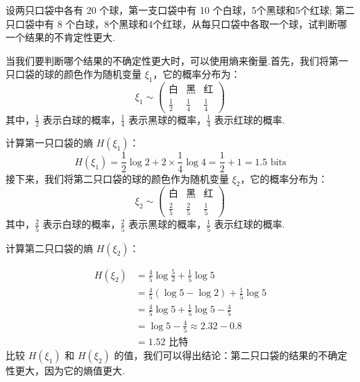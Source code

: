 \begin{exercise}
    设两只口袋中各有 20 个球，第一支口袋中有 10 个白球，5个黑球和5个红球; 第二只口袋中有 8 个白球，8个黑球和4个红球，从每只口袋中各取一个球，试判断哪一个结果的不肯定性更大.
\end{exercise}
 \begin{solution}
 当我们要判断哪个结果的不确定性更大时，可以使用熵来衡量.首先，我们将第一只口袋的球的颜色作为随机变量 $\xi_1$，它的概率分布为：
$$
\xi_1 \sim \left(\begin{array}{ccc}\text{白} & \text{黑} & \text{红} \\ \frac{1}{2} & \frac{1}{4} & \frac{1}{4}\end{array}\right)
$$
其中，$\frac{1}{2}$ 表示白球的概率，$\frac{1}{4}$ 表示黑球的概率，$\frac{1}{4}$ 表示红球的概率.

计算第一只口袋的熵 $H(\xi_1)$：
$$ H\left(\xi_{1}\right)=\frac{1}{2} \log 2+2 \times \frac{1}{4} \log 4=\frac{1}{2}+1=1.5  \text{ bits}
$$
接下来，我们将第二只口袋的球的颜色作为随机变量 $\xi_2$，它的概率分布为：
$$
\xi_2 \sim \left(\begin{array}{ccc}\text{白} & \text{黑} & \text{红} \\ \frac{2}{5} & \frac{2}{5} & \frac{1}{5}\end{array}\right)
$$
其中，$\frac{2}{5}$ 表示白球的概率，$\frac{2}{5}$ 表示黑球的概率，$\frac{1}{5}$ 表示红球的概率.

计算第二只口袋的熵 $H(\xi_2)$：

$$
\begin{aligned}
H\left(\xi_{2}\right) & =\frac{4}{5} \log \frac{5}{2}+\frac{1}{5} \log 5 \\
& =\frac{4}{5}(\log 5-\log 2)+\frac{1}{5} \log 5 \\
& =\frac{4}{5} \log 5+\frac{1}{5} \log 5-\frac{4}{5} \\
& =\log 5-\frac{4}{5} \approx 2.32-0.8 \\
& =1.52 \text { 比特 }
\end{aligned}
$$
比较 $H(\xi_1)$ 和 $H(\xi_2)$ 的值，我们可以得出结论：第二只口袋的结果的不确定性更大，因为它的熵值更大. 
 \end{solution}

